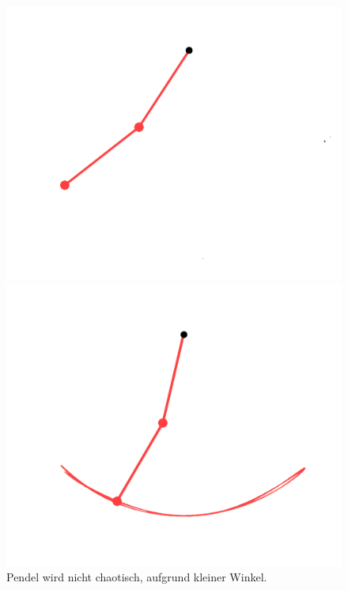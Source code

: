 \begin{figure}
    \label{fig:pendel_bei_weniger_90}
    \centering
    \begin{minipage}{0.45\textwidth}
        \centering
        \includegraphics[width=\textwidth]{papers/doppelpendel/images/pendel_stand_nichtchaotisch.png}
    \end{minipage}
    \hfill
    \begin{minipage}{0.45\textwidth}
        \centering
        \includegraphics[width=\textwidth]{papers/doppelpendel/images/pendel_spur_nichtchaotisch.png}
    \end{minipage}
    \caption{Pendel wird nicht chaotisch, aufgrund kleiner Winkel.}
    \label{fig:pendel_nichtchaotisch}
\end{figure}
